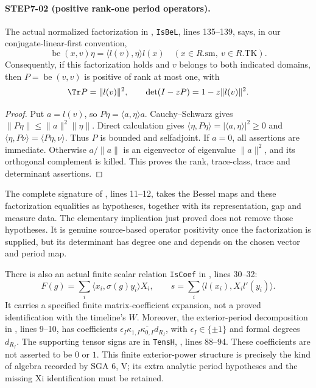 \paragraph{STEP7-02 (positive rank-one period operators).}
The actual normalized factorization in
,
\texttt{IsBeL}, lines 135--139, says, in our conjugate-linear-first convention,
\[
 \operatorname{be}(x,v)\eta=\langle l(v),\eta\rangle l(x)
 \quad(x\in R.\mathrm{sm},\ v\in R.\mathrm{TK}).
\]
Consequently, if this factorization holds and $v$ belongs to both indicated domains, then $P=\operatorname{be}(v,v)$ is positive of rank at most one, with
\[
 \Tr P=\|l(v)\|^2,\qquad \det(I-zP)=1-z\|l(v)\|^2.
\]
\begin{proof}
Put $a=l(v)$, so $P\eta=\langle a,\eta\rangle a$. Cauchy--Schwarz gives $\|P\eta\|\le\|a\|^2\|\eta\|$. Direct calculation gives $\langle\eta,P\eta\rangle=|\langle a,\eta\rangle|^2\ge0$ and $\langle\eta,P\nu\rangle=\langle P\eta,\nu\rangle$. Thus $P$ is bounded and selfadjoint. If $a=0$, all assertions are immediate. Otherwise $a/\|a\|$ is an eigenvector of eigenvalue $\|a\|^2$, and its orthogonal complement is killed. This proves the rank, trace-class, trace and determinant assertions.
\end{proof}
The complete signature of
, lines 11--12, takes the Bessel maps and these factorization equalities as hypotheses, together with its representation, gap and measure data. The elementary implication just proved does not remove those hypotheses. It is genuine source-based operator positivity once the factorization is supplied, but its determinant has degree one and depends on the chosen vector and period map.

There is also an actual finite scalar relation \texttt{IsCoef} in
, lines 30--32:
\[
 F(g)=\sum_i\langle x_i,\sigma(g)y_i\rangle X_i,
 \qquad s=\sum_i\langle l(x_i),X_i l'(y_i)\rangle.
\]
It carries a specified finite matrix-coefficient expansion, not a proved identification with the timeline's $W$. Moreover, the exterior-period decomposition in
, lines 9--10, has coefficients
$\epsilon_I\kappa_{1,I}\overline{\kappa_{0,I}}d_{R_I}$, with $\epsilon_I\in\{\pm1\}$ and formal degrees $d_{R_I}$. The supporting tensor signs are in \texttt{TensH}, , lines 88--94. These coefficients are not asserted to be $0$ or $1$. This finite exterior-power structure is precisely the kind of algebra recorded by SGA 6, V; its extra analytic period hypotheses and the missing Xi identification must be retained.

